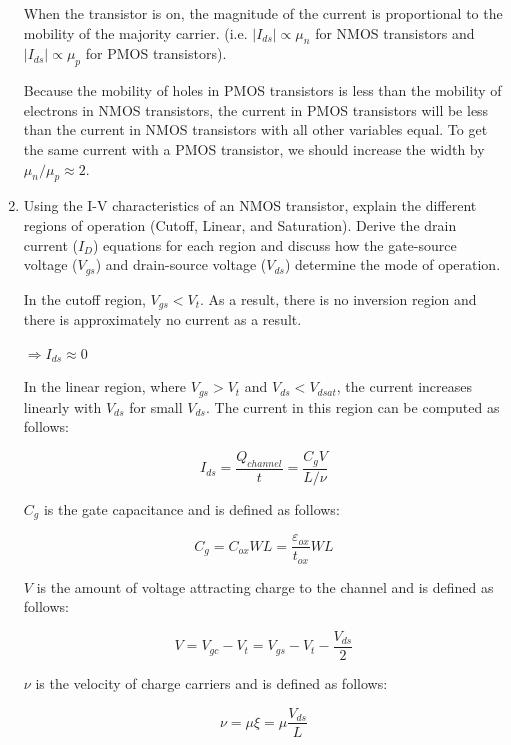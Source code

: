 \documentclass[fleqn]{article}
\begin{document}
\begin{enumerate}
		When the transistor is on, the magnitude of the current is proportional to the mobility of the majority carrier. (i.e. $|I_{ds}| \propto \mu_n$ for NMOS transistors and $|I_{ds}| \propto \mu_p$ for PMOS transistors).
		
		Because the mobility of holes in PMOS transistors is less than the mobility of electrons in NMOS transistors, the current in PMOS transistors will be less than the current in NMOS transistors with all other variables equal. To get the same current with a PMOS transistor, we should increase the width by $\mu_n/\mu_p \approx 2$.
		
		\item Using the I-V characteristics of an NMOS transistor, explain the different regions of operation (Cutoff, Linear, and Saturation). Derive the drain current ($I_D$) equations for each region and discuss how the gate-source voltage ($V_{gs}$) and drain-source voltage ($V_{ds}$) determine the mode of operation. 

		In the cutoff region, $V_{gs} < V_t$. As a result, there is no inversion region and there is approximately no current as a result.
		
		$\Rightarrow I_{ds} \approx 0$
		
		In the linear region, where $V_{gs} > V_t$ and $V_{ds} < V_{dsat}$, the current increases linearly with $V_{ds}$ for small $V_{ds}$. The current in this region can be computed as follows:
		
		\begin{equation*}		
			I_{ds} = \frac{Q_{channel}}{t} = \frac{C_gV}{L/\nu}
		\end{equation*}
		
		$C_g$ is the gate capacitance and is defined as follows:
		
		\begin{equation*}
			C_g = C_{ox}WL = \frac{\varepsilon_{ox}}{t_{ox}}WL
		\end{equation*}
		
		$V$ is the amount of voltage attracting charge to the channel and is defined as follows:
		
		\begin{equation*}
			V = V_{gc} - V_t = V_{gs} - V_t - \frac{V_{ds}}{2}
		\end{equation*}
		
		$\nu$ is the velocity of charge carriers and is defined as follows:
		
		\begin{equation*}
			\nu = \mu\xi = \mu\frac{V_{ds}}{L}
		\end{equation*}
		

\end{enumerate}
\end{document}
